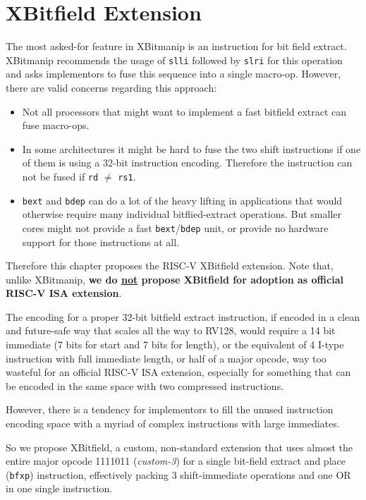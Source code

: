 \chapter{XBitfield Extension}
\label{bfxp}

The most asked-for feature in XBitmanip is an instruction for bit field
extract. XBitmanip recommends the usage of {\tt slli} followed by {\tt slri}
for this operation and asks implementors to fuse this sequence into a single
macro-op. However, there are valid concerns regarding this approach:

\begin{itemize}
\item Not all processors that might want to implement a fast bitfield extract
can fuse macro-ops.
\item In some architectures it might be hard to fuse the two shift instructions
if one of them is using a 32-bit instruction encoding. Therefore the instruction
can not be fused if {\tt rd} $\ne$ {\tt rs1}.
\item {\tt bext} and {\tt bdep} can do a lot of the heavy lifting in applications that
would otherwise require many individual bitflied-extract operations. But smaller cores might not provide
a fast {\tt bext}/{\tt bdep} unit, or provide no hardware support for those instructions at all.
\end{itemize}

Therefore this chapter proposes the RISC-V XBitfield extension. Note that, unlike
XBitmanip, {\bf we do \underline{not} propose XBitfield for adoption as official RISC-V ISA extension}.

The encoding for a proper 32-bit bitfield extract instruction, if encoded
in a clean and future-safe way that scales all the way to RV128, would require
a 14 bit immediate (7 bits for start and 7 bits for length), or the equivalent
of 4 I-type instruction with full immediate length, or half of a major opcode,
way too wasteful for an official RISC-V ISA extension, especially for something
that can be encoded in the same space with two compressed instructions.

However, there is a tendency for implementors to fill the unused instruction
encoding space with a myriad of complex instructions with large immediates.~\cite{Ri5cy}

So we propose XBitfield, a custom, non-standard extension that uses almost the
entire major opcode 1111011 ({\it custom-3}) for a single bit-field extract and
place ({\tt bfxp}) instruction, effectively packing 3 shift-immediate
operations and one OR in one single instruction.

